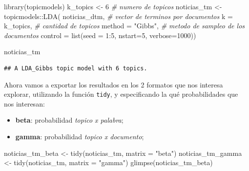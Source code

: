 \documentclass[
]{book}
\newenvironment{Shaded}{\begin{snugshade}}{\end{snugshade}}
\newcommand{\AttributeTok}[1]{\textcolor[rgb]{0.77,0.63,0.00}{#1}}
\newcommand{\CommentTok}[1]{\textcolor[rgb]{0.56,0.35,0.01}{\textit{#1}}}
\newcommand{\DecValTok}[1]{\textcolor[rgb]{0.00,0.00,0.81}{#1}}
\newcommand{\FunctionTok}[1]{\textcolor[rgb]{0.00,0.00,0.00}{#1}}
\newcommand{\NormalTok}[1]{#1}
\newcommand{\OtherTok}[1]{\textcolor[rgb]{0.56,0.35,0.01}{#1}}
\newcommand{\SpecialCharTok}[1]{\textcolor[rgb]{0.00,0.00,0.00}{#1}}
\newcommand{\StringTok}[1]{\textcolor[rgb]{0.31,0.60,0.02}{#1}}
\providecommand{\tightlist}{%
  \setlength{\itemsep}{0pt}\setlength{\parskip}{0pt}}
\begin{document}
\begin{Shaded}
\begin{Highlighting}[]
\FunctionTok{library}\NormalTok{(topicmodels)}
\NormalTok{k\_topics }\OtherTok{\textless{}{-}} \DecValTok{6} \CommentTok{\# numero de topicos}
\NormalTok{noticias\_tm }\OtherTok{\textless{}{-}}\NormalTok{ topicmodels}\SpecialCharTok{::}\FunctionTok{LDA}\NormalTok{(}
\NormalTok{  noticias\_dtm, }\CommentTok{\# vector de terminos por documentos}
  \AttributeTok{k =}\NormalTok{ k\_topics, }\CommentTok{\# cantidad de topicos}
  \AttributeTok{method =} \StringTok{"Gibbs"}\NormalTok{, }\CommentTok{\# metodo de sampleo de los documentos}
  \AttributeTok{control =} \FunctionTok{list}\NormalTok{(}\AttributeTok{seed =} \DecValTok{1}\SpecialCharTok{:}\DecValTok{5}\NormalTok{, }\AttributeTok{nstart=}\DecValTok{5}\NormalTok{, }\AttributeTok{verbose=}\DecValTok{1000}\NormalTok{))}
\end{Highlighting}
\end{Shaded}

\begin{Shaded}
\begin{Highlighting}[]
\NormalTok{noticias\_tm}
\end{Highlighting}
\end{Shaded}

\begin{verbatim}
## A LDA_Gibbs topic model with 6 topics.
\end{verbatim}

Ahora vamos a exportar los resultados en los 2 formatos que nos interesa explorar, utilizando la función \texttt{tidy}, y especificando la qué probabilidades que nos interesan:

\begin{itemize}
\tightlist
\item
  \textbf{beta}: probabilidad \emph{topico x palabra};
\item
  \textbf{gamma}: probabilidad \emph{topico x documento};
\end{itemize}

\begin{Shaded}
\begin{Highlighting}[]
\NormalTok{noticias\_tm\_beta }\OtherTok{\textless{}{-}} \FunctionTok{tidy}\NormalTok{(noticias\_tm, }\AttributeTok{matrix =} \StringTok{"beta"}\NormalTok{)}
\NormalTok{noticias\_tm\_gamma }\OtherTok{\textless{}{-}} \FunctionTok{tidy}\NormalTok{(noticias\_tm, }\AttributeTok{matrix =} \StringTok{"gamma"}\NormalTok{)}
\FunctionTok{glimpse}\NormalTok{(noticias\_tm\_beta)}
\end{Highlighting}
\end{Shaded}
\end{document}
